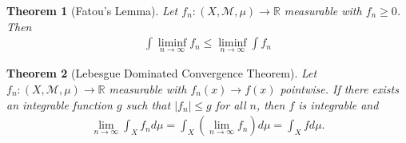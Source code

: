\documentclass[12pt]{amsart}         %
\newtheorem{theorem}{Theorem}[section]
\theoremstyle{remark}
\newcommand{\R}{\mathbb{R}}
\begin{document}
\begin{theorem}[Fatou's Lemma]
Let $f_n: (X,\mathcal{M},\mu) \rightarrow \R$ measurable with $f_n \geq 0$. Then
\begin{align*}
\int \liminf_{n\rightarrow \infty} f_n \leq \liminf_{n\rightarrow \infty} \int f_n
\end{align*}
\end{theorem}

\begin{theorem}[Lebesgue Dominated Convergence Theorem]
Let $f_n: (X,\mathcal{M},\mu) \rightarrow \R$ measurable with $f_n(x) \rightarrow f(x)$ pointwise. If there exists an integrable function $g$ such that $|f_n| \leq g$ for all $n$, then $f$ is integrable and
\begin{align*}
\lim_{n\rightarrow \infty} \int_X f_n d\mu = \int_X \left(\lim_{n\rightarrow \infty} f_n\right) d\mu = \int_X f d\mu.
\end{align*}
\end{theorem}
\end{document}
